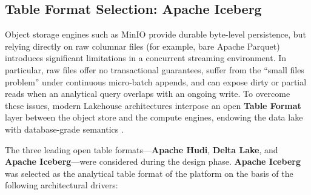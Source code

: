 \subsection{Table Format Selection: Apache Iceberg}
\label{subsec:table-format-iceberg}

Object storage engines such as MinIO provide durable byte-level persistence, but relying directly on raw columnar files (for example, bare Apache Parquet) introduces significant limitations in a concurrent streaming environment.
In particular, raw files offer no transactional guarantees, suffer from the ``small files problem'' under continuous micro-batch appends, and can expose dirty or partial reads when an analytical query overlaps with an ongoing write.
To overcome these issues, modern Lakehouse architectures interpose an open \textbf{Table Format} layer between the object store and the compute engines, endowing the data lake with database-grade semantics \cite{apache_iceberg}.

The three leading open table formats---\textbf{Apache Hudi}, \textbf{Delta Lake}, and \textbf{Apache Iceberg}---were considered during the design phase.
\textbf{Apache Iceberg} was selected as the analytical table format of the platform on the basis of the following architectural drivers:

